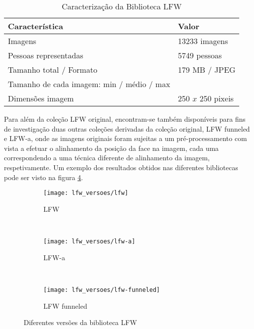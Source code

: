 \begin{center}
\begin{table}
	\caption{Caracterização da Biblioteca LFW}
	\begin{center}
    \begin{tabular}{ll}
    \hline
    Característica                            & Valor            \\ \hline
    Imagens                                   & 13233 imagens    \\
    Pessoas representadas                     & 5749 pessoas     \\
    Tamanho total / Formato                   & 179 MB / JPEG    \\
    Tamanho de cada imagem: min / médio / max & ~                \\
    Dimensões imagem                          & 250 $x$ 250 pixeis \\
    \hline
    \end{tabular}
	\label{tab:lfw}
	\end{center}
\end{table}
\end{center}

Para além da coleção LFW original, encontram-se também disponíveis para fins de investigação duas outras coleções derivadas da coleção original, LFW funneled e LFW-a, onde as imagens originais foram sujeitas a um pré-processamento com vista a efetuar o alinhamento da posição da face na imagem, cada uma correspondendo a uma técnica diferente de alinhamento da imagem, respetivamente. Um exemplo dos resultados obtidos nas diferentes bibliotecas pode ser visto na figura \ref{fig:lfwversoes}.

\begin{figure}[t]
        \centering
        \begin{subfigure}[b]{0.25\textwidth}
                \centering
                \texttt{[image: lfw\_versoes/lfw]}
                \caption{LFW}
                \label{fig:lfw_original}
        \end{subfigure}%
        ~ 
        \begin{subfigure}[b]{0.25\textwidth}
                \centering
                \texttt{[image: lfw\_versoes/lfw-a]}
                \caption{LFW-a}
                \label{fig:lfw_a}
        \end{subfigure}
        ~ 
        \begin{subfigure}[b]{0.25\textwidth}
                \centering
                \texttt{[image: lfw\_versoes/lfw-funneled]}
                \caption{LFW funneled}
                \label{fig:lfw_funneled}
        \end{subfigure}
        \caption{Diferentes versões da biblioteca LFW}\label{fig:lfwversoes}
\end{figure}

